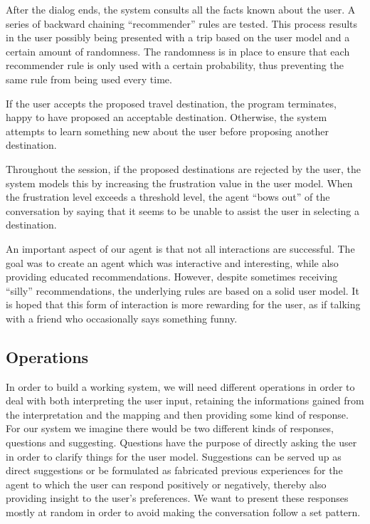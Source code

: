 \documentclass[11pt]{article} %
\begin{document}
After the dialog ends, the system consults all the facts known about the user. A series of backward chaining ``recommender'' rules are tested. This process results in the user possibly being presented with a trip based on the user model and a certain amount of randomness. The randomness is in place to ensure that each recommender rule is only used with a certain probability, thus preventing the same rule from being used every time.

If the user accepts the proposed travel destination, the program terminates, happy to have proposed an acceptable destination. Otherwise, the system attempts to learn something new about the user before proposing another destination.

Throughout the session, if the proposed destinations are rejected by the user, the system models this by increasing the frustration value in the user model. When the frustration level exceeds a threshold level, the agent ``bows out'' of the conversation by saying that it seems to be unable to assist the user in selecting a destination.

An important aspect of our agent is that not all interactions are successful. The goal was to create an agent which was interactive and interesting, while also providing educated recommendations. However, despite sometimes receiving ``silly'' recommendations, the underlying rules are based on a solid user model. It is hoped that this form of interaction is more rewarding for the user, as if talking with a friend who occasionally says something funny.


\subsection{Operations}

In order to build a working system, we will need different operations in order to deal with both interpreting the user input, retaining the informations gained from the interpretation and the mapping and then providing some kind of response. For our system we imagine there would be two different kinds of responses, questions and suggesting. Questions have the purpose of directly asking the user in order to clarify things for the user model. Suggestions can be served up as direct suggestions or be formulated as fabricated previous experiences for the agent to which the user can respond positively or negatively, thereby also providing insight to the user's preferences.
We want to present these responses mostly at random in order to avoid making the conversation follow a set pattern.
\end{document}
